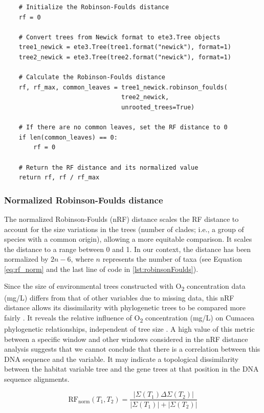 {\begin{lstlisting}
    # Initialize the Robinson-Foulds distance
    rf = 0
    
    # Convert trees from Newick format to ete3.Tree objects
    tree1_newick = ete3.Tree(tree1.format("newick"), format=1)
    tree2_newick = ete3.Tree(tree2.format("newick"), format=1)
    
    # Calculate the Robinson-Foulds distance
    rf, rf_max, common_leaves = tree1_newick.robinson_foulds(
                                tree2_newick, 
                                unrooted_trees=True)
                                
    # If there are no common leaves, set the RF distance to 0
    if len(common_leaves) == 0:
        rf = 0

    # Return the RF distance and its normalized value
    return rf, rf / rf_max
\end{lstlisting}

\subsubsection{Normalized Robinson-Foulds distance}\label{RFnorm}
The normalized Robinson-Foulds (nRF) distance scales the RF distance to account for the size variations in the trees (number of clades; i.e., a group of species with a common origin), allowing a more equitable comparison. It scales the distance to a range between 0 and 1. In our context, the distance has been normalized by $2n-6$, where $n$ represents the number of taxa (see Equation \eqref{eq:rf_norm} and the last line of code in \autoref{lst:robinsonFoulds}).

Since the size of environmental trees constructed with O\textsubscript{2} concentration data (mg/L) differs from that of other variables due to missing data, this nRF distance allows its dissimilarity with phylogenetic trees to be compared more fairly \citep{tahiri2018new, koshkarov_phylogeography_2022}. It reveals the relative influence of O\textsubscript{2} concentration (mg/L) on Cumacea phylogenetic relationships, independent of tree size \citep{tahiri2018new, koshkarov_phylogeography_2022}. A high value of this metric between a specific window and other windows considered in the nRF distance analysis suggests that we cannot conclude that there is a correlation between this DNA sequence and the variable. It may indicate a topological dissimilarity between the habitat variable tree and the gene trees at that position in the DNA sequence alignments.

\begin{equation}\label{eq:rf_norm}
    \text{RF}_{\text{norm}}(T_1, T_2) = \frac{| \Sigma(T_1) \Delta \Sigma(T_2) |}{| \Sigma(T_1) | + | \Sigma(T_2) |}
\end{equation}

}
